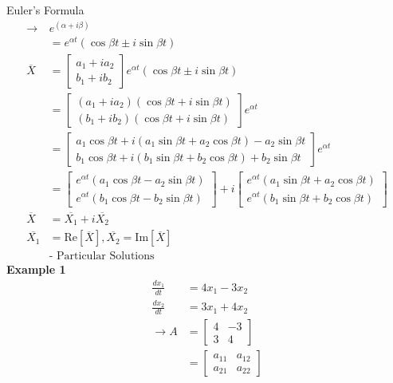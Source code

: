 \documentclass[10pt, letterpaper]{article}
\begin{document}
Euler's Formula
\begin{align*}
\rightarrow & e^{(\alpha+i\beta)}\\
&= e^{\alpha t}(\cos \beta t \pm i\sin \beta t)\\
\overline{X} &= \begin{bmatrix}
	a_1 + ia_2\\
	b_1 + ib_2
\end{bmatrix} e^{\alpha t}(\cos \beta t \pm i \sin \beta t)\\
&= \begin{bmatrix}
	(a_1+ia_2)(\cos \beta t + i \sin \beta t)\\
	(b_1+ib_2)(\cos \beta t + i \sin \beta t)
\end{bmatrix} e^{\alpha t}\\
&= \begin{bmatrix}
	a_1\cos \beta t + i(a_1\sin \beta t + a_2\cos \beta t) - a_2 \sin \beta t\\
	b_1\cos \beta t + i(b_1\sin \beta t + b_2\cos \beta t) + b_2 \sin \beta t
\end{bmatrix} e^{\alpha t}\\
&= \begin{bmatrix}
	e^{\alpha t} (a_1 \cos \beta t -a_2\sin \beta t)\\
	e^{\alpha t} (b_1 \cos \beta t -b_2\sin \beta t)
\end{bmatrix} +i \begin{bmatrix}
	e^{\alpha t} (a_1\sin \beta t + a_2 \cos \beta t)\\
	e^{\alpha t} (b_1\sin \beta t + b_2 \cos \beta t)
\end{bmatrix}\\
\overline{X} &= \overline{X_1} + i\overline{X_2}\\
\overline{X_1} &= \text{Re}[\overline{X}], \overline{X_2} = \text{Im}[\overline{X}]\\
& \text{- Particular Solutions}
\end{align*}
\textbf{Example 1}\\
\begin{align*}
\frac{dx_1}{dt} &= 4x_1-3x_2\\
\frac{dx_2}{dt} &= 3x_1+4x_2\\
\rightarrow A &= \begin{bmatrix}
	4 & -3\\
	3 & 4
\end{bmatrix}\\
&= \begin{bmatrix}
	a_{11} & a_{12}\\
	a_{21} & a_{22}
\end{bmatrix}
\end{align*}
\end{document}
